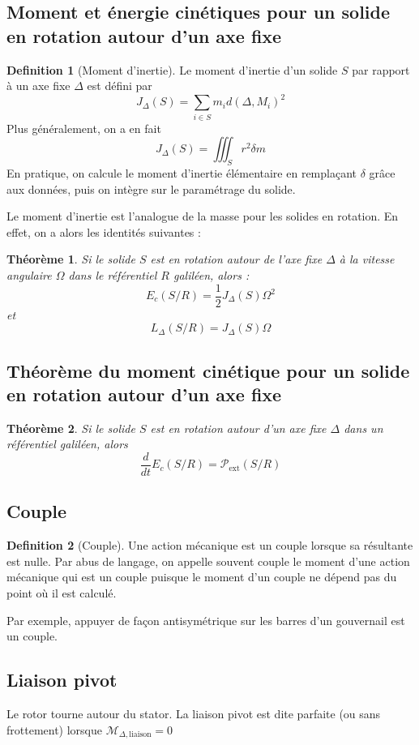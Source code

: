 \documentclass[french]{book}
\theoremstyle{plain}
\newtheorem{thm}{Théorème}
\theoremstyle{definition}
\newtheorem{dfn}{Definition}
\theoremstyle{remark}
\begin{document}
\subsection{Moment et énergie cinétiques pour un solide en rotation autour d'un axe fixe}
\begin{dfn}[Moment d'inertie]
	Le moment d'inertie d'un solide $S$ par rapport à un axe fixe $\Delta$ est défini par $$J_\Delta(S)=\sum_{i\in S} m_id(\Delta,M_i)^2$$ Plus généralement, on a en fait $$J_\Delta(S)=\iiint_S r^2\delta m$$ En pratique, on calcule le moment d'inertie élémentaire en remplaçant $\delta$ grâce aux données, puis on intègre sur le paramétrage du solide.
\end{dfn}
Le moment d'inertie est l'analogue de la masse pour les solides en rotation. En effet, on a alors les identités suivantes : 
\begin{thm}
	Si le solide $S$ est en rotation autour de l'axe fixe $\Delta$ à la vitesse angulaire $\Omega$ dans le référentiel $R$ galiléen, alors : $$E_c(S/R)=\frac{1}{2}J_\Delta(S)\Omega^2$$ et $$L_\Delta(S/R)=J_\Delta(S)\Omega$$
\end{thm}
\subsection{Théorème du moment cinétique pour un solide en rotation autour d'un axe fixe}
\begin{thm}
	Si le solide $S$ est en rotation autour d'un axe fixe $\Delta$ dans un référentiel galiléen, alors $$\frac{d}{dt}E_c(S/R)=\mathcal{P}_{\text{ext}}(S/R)$$
\end{thm}
\subsection{Couple}
\begin{dfn}[Couple]
	Une action mécanique est un couple lorsque sa résultante est nulle. Par abus de langage, on appelle souvent couple le moment d'une action mécanique qui est un couple puisque le moment d'un couple ne dépend pas du point où il est calculé.
\end{dfn}
Par exemple, appuyer de façon antisymétrique sur les barres d'un gouvernail est un couple.
\subsection{Liaison pivot}
Le rotor tourne autour du stator. La liaison pivot est dite parfaite (ou sans frottement) lorsque $\mathcal{M}_{\Delta,\text{liaison}}=0$
\end{document}
